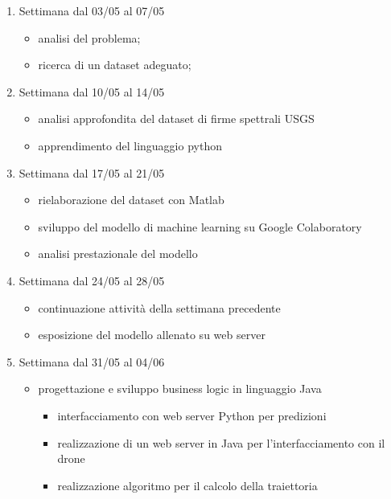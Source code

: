 \begin{enumerate}
    \item Settimana dal 03/05 al 07/05
    \begin{itemize}
        \item analisi del problema;
        \item ricerca di un dataset adeguato;
    \end{itemize}
    
    \item Settimana dal 10/05 al 14/05
    \begin{itemize}
        \item analisi approfondita del dataset di firme spettrali USGS
        \item apprendimento del linguaggio python
    \end{itemize}
    
    \item Settimana dal 17/05 al 21/05
    \begin{itemize}
        \item rielaborazione del dataset con Matlab
        \item sviluppo del modello di machine learning su Google Colaboratory
        \item analisi prestazionale del modello
    \end{itemize}
    
    \item Settimana dal 24/05 al 28/05
    \begin{itemize}
        \item continuazione attività della settimana precedente
        \item esposizione del modello allenato su web server
    \end{itemize}
    
    \item Settimana dal 31/05 al 04/06
    \begin{itemize}
        \item progettazione e sviluppo business logic in linguaggio Java
        \begin{itemize}
            \item interfacciamento con web server Python per predizioni
            \item realizzazione di un web server in Java per l'interfacciamento con il drone
            \item realizzazione algoritmo per il calcolo della traiettoria
        \end{itemize}
    \end{itemize}
    

\end{enumerate}
